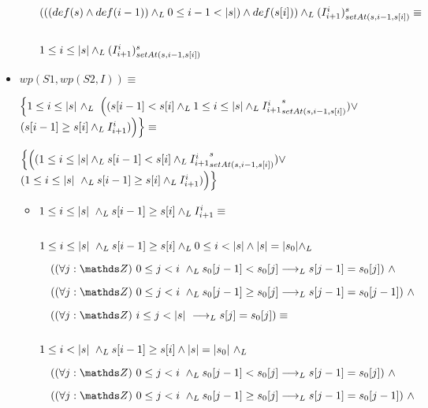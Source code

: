 \documentclass{article}
\begin{document}
\begin{itemize}
\begin{itemize}
        $ $

        $ (((def(s) \wedge def(i-1)) \land _L 0 \leq i-1 < |s|) \wedge def(s[i])) \land _L (I_{i+1}^{i})_{setAt(s,i-1, s[i])}^{s} \equiv $

        $ $

        $ 1 \leq i \leq |s| \land _L (I_{i+1}^{i})_{setAt(s,i-1, s[i])}^{s}$

    \end{itemize}

    \item $wp(S1, wp(S2, I)) \equiv$

    $ \Big\{ 1 \leq i \leq \longitud{s}\ \yLuego $ 
    $ \Big( (s[i-1] < s[i] \land _L 1 \leq i \leq |s| \land _L {I_{i+1}^{i}}_{setAt(s,i-1, s[i])}^{s}) \vee $
    $ (s[i-1] \geq s[i] \land _L I_{i+1}^{i}) \Big) \Big\} \equiv $
 
    $ \Big\{ \Big((1 \leq i \leq |s| \land _L s[i-1] < s[i] \land _L {I_{i+1}^{i}}_{setAt(s,i-1, s[i])}^{s}) \vee $
    $ (1 \leq i \leq \longitud{s}\ \yLuego s[i-1] \geq s[i] \yLuego I_{i+1}^{i}) \Big) \Big\} $

    \begin{itemize}
        
        \item $1 \leq i \leq |s|\ \land _L s[i-1] \geq s[i] \land _L I_{i+1}^{i} \equiv$

        $ $

        $ 1 \leq i \leq |s|\ \land _L s[i-1] \geq s[i] \land _L 0 \leq i < |s| \wedge |s| = |s_0| \land _L$

        $\quad (\paraTodo{j}{0}{i} \yLuego s_0[j-1] < s_0[j] \implicaLuego s[j-1] = s_0[j])\ \wedge $
    
        $\quad (\paraTodo{j}{0}{i} \yLuego s_0[j-1] \geq s_0[j] \implicaLuego s[j-1] = s_0[j-1])\ \wedge$
    
        $\quad (\paraTodo{j}{i}{\longitud{s}} \implicaLuego s[j] = s_0[j]) \equiv$

        $ $

        $ 1 \leq i < |s|\ \land _L s[i-1] \geq s[i] \wedge |s| = |s_0|\ \land _L$

        $\quad (\paraTodo{j}{0}{i} \yLuego s_0[j-1] < s_0[j] \implicaLuego s[j-1] = s_0[j])\ \wedge $
    
        $\quad (\paraTodo{j}{0}{i} \yLuego s_0[j-1] \geq s_0[j] \implicaLuego s[j-1] = s_0[j-1])\ \wedge$
    

\end{itemize}
\end{itemize}
\end{document}
